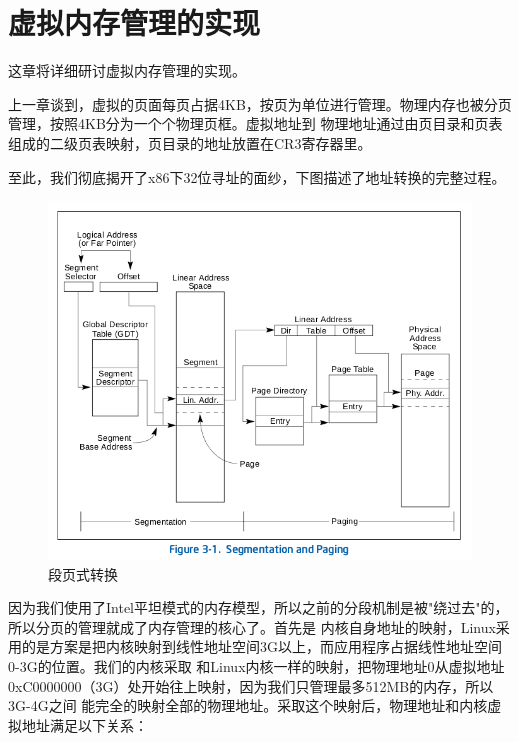 
\section {虚拟内存管理的实现}

\par 这章将详细研讨虚拟内存管理的实现。

\par 上一章谈到，虚拟的页面每页占据4KB，按页为单位进行管理。物理内存也被分页管理，按照4KB分为一个个物理页框。虚拟地址到\allowbreak
物理地址通过由页目录和页表组成的二级页表映射，页目录的地址放置在CR3寄存器里。

\par 至此，我们彻底揭开了x86下32位寻址的面纱，下图描述了地址转换的完整过程。

\begin{figure}[ht]
      \centering
      \includegraphics[scale=0.6]{picture/chapt10/ADDR_TRAN.png}
      \caption{段页式转换}
\end{figure}

\par 因为我们使用了Intel平坦模式的内存模型，所以之前的分段机制是被"绕过去"的，所以分页的管理就成了内存管理的核心了。首先是\allowbreak
内核自身地址的映射，Linux采用的是方案是把内核映射到线性地址空间3G以上，而应用程序占据线性地址空间0-3G的位置。我们的内核采取\allowbreak
和Linux内核一样的映射，把物理地址0从虚拟地址0xC0000000（3G）处开始往上映射，因为我们只管理最多512MB的内存，所以3G-4G之间\allowbreak
能完全的映射全部的物理地址。采取这个映射后，物理地址和内核虚拟地址满足以下关系：

